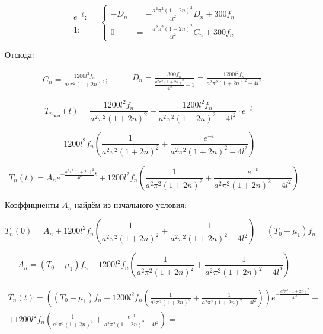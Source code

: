 \begin{equation*}
\begin{aligned}
e^{-t}: \\
\\
1:
\end{aligned}
\quad \left\{
\begin{aligned}
       -D_{n} & = -\frac{a^{2}\pi^{2}(1 + 2n)^{2}}{4l^{2}} D_{n} + 300f_{n} \\
       0 & = -\frac{a^{2}\pi^{2}(1 + 2n)^{2}}{4l^{2}} C_{n} + 300f_{n}
\end{aligned}
\right.
\end{equation*} 

Отсюда:

\begin{equation*}
  \begin{split}
    C_{n} = \frac{1200l^{2}f_{n}}{a^{2}\pi^{2}(1 + 2n)^{2}};
  \end{split}
\quad\quad
  \begin{split}
    D_{n} = \frac{300f_{n}}{\frac{a^{2}\pi^{2}(1 + 2n)^{2}}{4l^{2}} - 1} = \frac{1200l^{2}f_{n}}{a^{2}\pi^{2}(1 + 2n)^{2} - 4l^{2}};
  \end{split}
\end{equation*}

$$T_{n_{\text{част}}}(t) = \frac{1200l^{2}f_{n}}{a^{2}\pi^{2}(1 + 2n)^{2}} + \frac{1200l^{2}f_{n}}{a^{2}\pi^{2}(1 + 2n)^{2}-4l^{2}} \cdot e^{-t}=$$

$$= 1200l^{2}f_{n} \left( \frac{1}{a^{2}\pi^{2}(1 + 2n)^{2}} + \frac{e^{-t}}{a^{2}\pi^{2}(1 + 2n)^{2} - 4l^{2}} \right)$$

$$T_{n}(t) = A_{n}e^{-\frac{a^{2}\pi^{2}(1 + 2n)^{2}}{4l^{2}}t} + 1200l^{2}f_{n} \left( \frac{1}{a^{2}\pi^{2}(1 + 2n)^{2}} + \frac{e^{-t}}{a^{2}\pi^{2}(1 + 2n)^{2} - 4l^{2}} \right)$$

Коэффициенты $A_{n}$ найдём из начального условия:

$$T_{n}(0) = A_{n} + 1200l^{2}f_{n}  \left( \frac{1}{a^{2}\pi^{2}(1 + 2n)^{2}} + \frac{1}{a^{2}\pi^{2}(1 + 2n)^{2} - 4l^{2}} \right) = (T_{0} - \mu_{1})f_{n}$$

$$A_{n} = (T_{0} - \mu_{1})f_{n} - 1200l^{2}f_{n} \left( \frac{1}{a^{2}\pi^{2}(1 + 2n)^{2}} + \frac{1}{a^{2}\pi^{2}(1 + 2n)^{2} - 4l^{2}} \right)$$

\begin{multline*}
T_{n}(t) =  \left( (T_{0} - \mu_{1})f_{n} - 1200l^{2}f_{n} \left( \frac{1}{a^{2}\pi^{2}(1 + 2n)^{2}} + \frac{1}{a^{2}\pi^{2}(1 + 2n)^{2} - 4l^{2}} \right) \right)e^{-\frac{a^{2}\pi^{2}(1 + 2n)^{2}}{4l^{2}}} + \\
+1200l^{2}f_{n}\left( \frac{1}{a^{2}\pi^{2}(1 + 2n)^{2}} + \frac{e^{-t}}{a^{2}\pi^{2}(1 + 2n)^{2} - 4l^{2}} \right) = 
\end{multline*}

